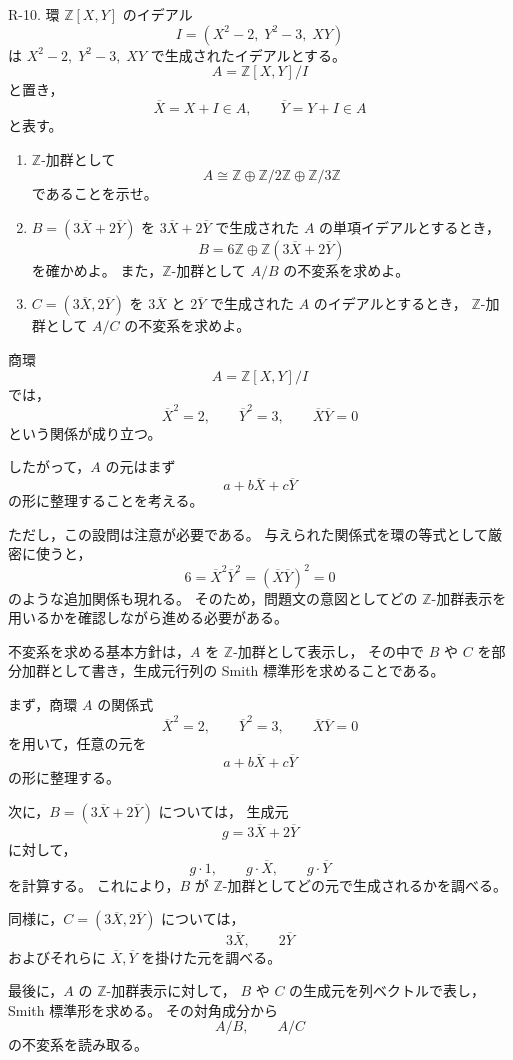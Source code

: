 
\begin{exercise}
	R-10. 環 $\mathbb{Z}[X,Y]$ のイデアル
	\[
	I=(X^2-2,\;Y^2-3,\;XY)
	\]
	は $X^2-2,\;Y^2-3,\;XY$ で生成されたイデアルとする。
	\[
	A=\mathbb{Z}[X,Y]/I
	\]
	と置き，
	\[
	\overline{X}=X+I\in A,
	\qquad
	\overline{Y}=Y+I\in A
	\]
	と表す。
	\begin{enumerate}
		\item $\mathbb{Z}$-加群として
		\[
		A\cong \mathbb{Z}\oplus \mathbb{Z}/2\mathbb{Z}\oplus \mathbb{Z}/3\mathbb{Z}
		\]
		であることを示せ。
		\item $B=(3\overline{X}+2\overline{Y})$ を
		$3\overline{X}+2\overline{Y}$ で生成された $A$ の単項イデアルとするとき，
		\[
		B=6\mathbb{Z}\oplus\mathbb{Z}(3\overline{X}+2\overline{Y})
		\]
		を確かめよ。
		また，$\mathbb{Z}$-加群として $A/B$ の不変系を求めよ。
		\item $C=(3\overline{X},2\overline{Y})$ を
		$3\overline{X}$ と $2\overline{Y}$ で生成された $A$ のイデアルとするとき，
		$\mathbb{Z}$-加群として $A/C$ の不変系を求めよ。
	\end{enumerate}
\end{exercise}

\begin{background}
	商環
	\[
	A=\mathbb{Z}[X,Y]/I
	\]
	では，
	\[
	\overline{X}^2=2,
	\qquad
	\overline{Y}^2=3,
	\qquad
	\overline{X}\overline{Y}=0
	\]
	という関係が成り立つ。
	
	したがって，$A$ の元はまず
	\[
	a+b\overline{X}+c\overline{Y}
	\]
	の形に整理することを考える。
	
	ただし，この設問は注意が必要である。
	与えられた関係式を環の等式として厳密に使うと，
	\[
	6=\overline{X}^2\overline{Y}^2
	=(\overline{X}\overline{Y})^2=0
	\]
	のような追加関係も現れる。
	そのため，問題文の意図としてどの $\mathbb{Z}$-加群表示を用いるかを確認しながら進める必要がある。
	
	不変系を求める基本方針は，$A$ を $\mathbb{Z}$-加群として表示し，
	その中で $B$ や $C$ を部分加群として書き，生成元行列の Smith 標準形を求めることである。
\end{background}

\begin{strategy}
	まず，商環 $A$ の関係式
	\[
	\overline{X}^2=2,
	\qquad
	\overline{Y}^2=3,
	\qquad
	\overline{X}\overline{Y}=0
	\]
	を用いて，任意の元を
	\[
	a+b\overline{X}+c\overline{Y}
	\]
	の形に整理する。
	
	次に，$B=(3\overline{X}+2\overline{Y})$ については，
	生成元
	\[
	g=3\overline{X}+2\overline{Y}
	\]
	に対して，
	\[
	g\cdot 1,\qquad
	g\cdot\overline{X},\qquad
	g\cdot\overline{Y}
	\]
	を計算する。
	これにより，$B$ が $\mathbb{Z}$-加群としてどの元で生成されるかを調べる。
	
	同様に，$C=(3\overline{X},2\overline{Y})$ については，
	\[
	3\overline{X},\qquad 2\overline{Y}
	\]
	およびそれらに $\overline{X},\overline{Y}$ を掛けた元を調べる。
	
	最後に，$A$ の $\mathbb{Z}$-加群表示に対して，
	$B$ や $C$ の生成元を列ベクトルで表し，Smith 標準形を求める。
	その対角成分から
	\[
	A/B,\qquad A/C
	\]
	の不変系を読み取る。
\end{strategy}